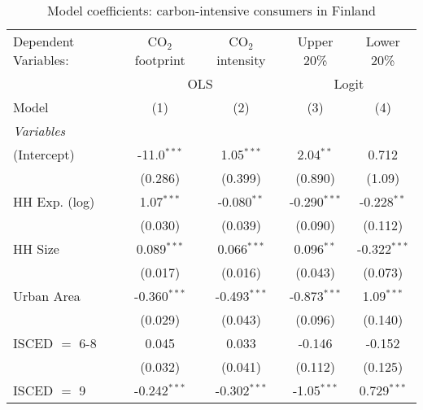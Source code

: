 
\begin{table}[htbp!]
   \centering
   \small
   \begin{adjustbox}{width = 1\textwidth, max height = 0.95\textheight, center}
      \begin{threeparttable}[b]
         \caption{\label{tab:Logit_1_FIN} Model coefficients: carbon-intensive consumers in Finland}
         \begin{tabular}{lcccc}
            \tabularnewline \midrule \midrule
            Dependent Variables: & CO$_{2}$ footprint & CO$_{2}$ intensity & Upper 20\%     & Lower 20\%\\   
             & \multicolumn{2}{c}{OLS} & \multicolumn{2}{c}{Logit} \\ 
            Model                & (1)                & (2)                & (3)            & (4)\\  
            \midrule
            \emph{Variables}\\
            (Intercept)          & -11.0$^{***}$      & 1.05$^{***}$       & 2.04$^{**}$    & 0.712\\   
                                 & (0.286)            & (0.399)            & (0.890)        & (1.09)\\   
            HH Exp. (log)        & 1.07$^{***}$       & -0.080$^{**}$      & -0.290$^{***}$ & -0.228$^{**}$\\   
                                 & (0.030)            & (0.039)            & (0.090)        & (0.112)\\   
            HH Size              & 0.089$^{***}$      & 0.066$^{***}$      & 0.096$^{**}$   & -0.322$^{***}$\\   
                                 & (0.017)            & (0.016)            & (0.043)        & (0.073)\\   
            Urban Area           & -0.360$^{***}$     & -0.493$^{***}$     & -0.873$^{***}$ & 1.09$^{***}$\\   
                                 & (0.029)            & (0.043)            & (0.096)        & (0.140)\\   
            ISCED $=$ 6-8        & 0.045              & 0.033              & -0.146         & -0.152\\   
                                 & (0.032)            & (0.041)            & (0.112)        & (0.125)\\   
            ISCED $=$ 9          & -0.242$^{***}$     & -0.302$^{***}$     & -1.05$^{***}$  & 0.729$^{***}$\\   

\end{tabular}
\end{threeparttable}
\end{adjustbox}
\end{table}
